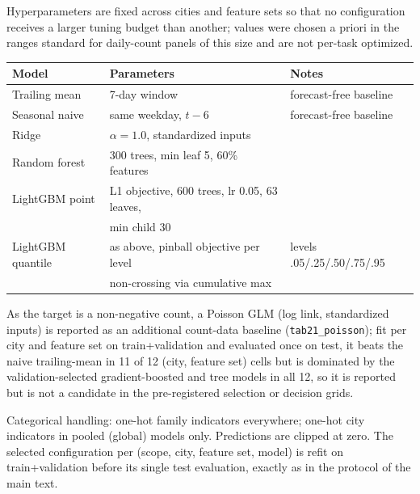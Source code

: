 Hyperparameters are fixed across cities and feature sets so that no
configuration receives a larger tuning budget than another; values were
chosen a priori in the ranges standard for daily-count panels of this
size and are not per-task optimized.

\begin{center}
\begin{tabular}{lll}
\toprule
Model & Parameters & Notes \\
\midrule
Trailing mean & 7-day window & forecast-free baseline \\
Seasonal naive & same weekday, $t-6$ & forecast-free baseline \\
Ridge & $\alpha=1.0$, standardized inputs & \\
Random forest & 300 trees, min leaf 5, 60\% features & \citet{breiman2001random} \\
LightGBM point & L1 objective, 600 trees, lr 0.05, 63 leaves, & \citet{ke2017lightgbm} \\
              & min child 30 & \\
LightGBM quantile & as above, pinball objective per level & levels .05/.25/.50/.75/.95 \\
              & non-crossing via cumulative max & \\
\bottomrule
\end{tabular}
\end{center}

As the target is a non-negative count, a Poisson GLM (log link,
standardized inputs) is reported as an additional count-data baseline
(\texttt{tab21\_poisson}); fit per city and feature set on train+validation
and evaluated once on test, it beats the naive trailing-mean in 11 of 12
(city, feature set) cells but is dominated by the validation-selected
gradient-boosted and tree models in all 12, so it is reported but is not a
candidate in the pre-registered selection or decision grids.

Categorical handling: one-hot family indicators everywhere; one-hot city
indicators in pooled (global) models only. Predictions are clipped at
zero. The selected configuration per (scope, city, feature set, model)
is refit on train+validation before its single test evaluation, exactly
as in the protocol of the main text.
